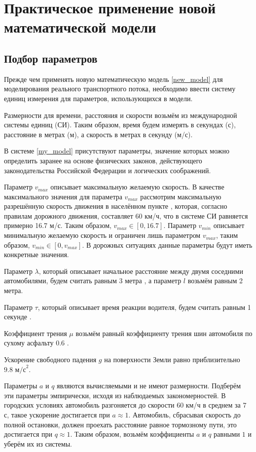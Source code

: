 \documentclass[12pt, a4paper]{extarticle}
\numberwithin{equation}{section}
\numberwithin{figure}{section}
\begin{document}
\section{Практическое применение новой математической модели} 

\subsection{Подбор параметров} 

Прежде чем применять новую математическую модель \eqref{new_model} для моделирования реального транспортного потока, необходимо ввести систему единиц измерения для параметров, использующихся в модели.

Размерности для времени, расстояния и скорости возьмём из международной системы единиц (СИ). Таким образом, время будем измерять в секундах (с), расстояние в метрах (м), а скорость в метрах в секунду (м/с).

В системе \eqref{my_model} присутствуют параметры, значение которых можно определить заранее на основе физических законов, действующего законодательства Российской Федерации и логических соображений.

Параметр $v_{max}$ описывает максимальную желаемую скорость. В качестве максимального значения для параметра $v_{max}$ рассмотрим максимальную разрешённую скорость движения в населённом пункте \cite{PDD}, которая, согласно правилам дорожного движения, составляет 60 км/ч, что в системе СИ равняется примерно 16.7 м/с. Таким образом, $v_{max} \in [0,16.7]$. Параметр $v_{min}$ описывает минимальную желаемую скорость и ограничен лишь параметром $v_{max}$, таким образом, $v_{min} \in [0,v_{max}]$. В дорожных ситуациях данные параметры будут иметь конкретные значения.

Параметр $\lambda$, который описывает начальное расстояние между двумя соседними автомобилями, будем считать равным 3 метра \cite{PDD}, а параметр $l$ возьмём равным 2 метра.

Параметр $\tau$, который описывает время реакции водителя, будем считать равным 1 секунде \cite{PDD}.

Коэффициент трения $\mu$ возьмём равный коэффициенту трения шин автомобиля по сухому асфальту $0.6$ \cite{Physics}.

Ускорение свободного падения $g$ на поверхности Земли равно приблизительно $9.8 \text{ м/с}^2$.

Параметры $a$ и $q$ являются вычисляемыми и не имеют размерности. Подберём эти параметры эмпирически, исходя из наблюдаемых закономерностей. В городских условиях автомобиль разгоняется до скорости 60 км/ч в среднем за 7 с, такое ускорение достигается при $a\approx1$. Автомобиль, сбрасывая скорость до полной остановки, должен проехать расстояние равное тормозному пути, это достигается при $q\approx1$. Таким образом, возьмём коэффициенты $a$ и $q$ равными $1$ и уберём их из системы.
\end{document}
